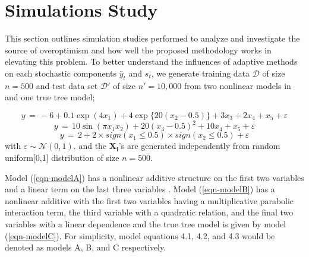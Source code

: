 
\chapter{Simulations Study}
This section outlines simulation studies performed to analyze and investigate the source of overoptimism and how well the proposed methodology works in elevating this problem. To better understand the influences of adaptive methods on each stochastic components $\bar{y}_t$ and $s_t$, we generate training data $\mathcal{D}$ of size $n=500$ and test data set $\mathcal{D}'$ of size $n'=10,000$ from two nonlinear models in \citep{friedman1991multivariate} and one  true tree model;

\begin{equation}
\label{eqn-modelA}
y \, = \,  -6 + 0.1 \exp(4x_1) + 4 \exp\{20(x_2 - 0.5)\} + 3 x_3 + 2 x_4 + x_5 + \varepsilon
\end{equation}
\begin{equation}
\label{eqn-modelB}
y \, = \,  10\sin(\pi x_1 x_2) + 20(x_3 - 0.5)^2 + 10 x_4 + x_5 + \varepsilon
\end{equation}
\begin{equation}
\label{eqn-modelC}
y \, = \,  2 + 2\times sign(x_1 \leq 0.5) \times sign(x_2 \leq 0.5) + \varepsilon
\end{equation}
with $\varepsilon \sim \mathcal{N}(0, 1).$ and the $\mathbf{X_i}$'s are generated independently from random uniform[0,1] distribution of size $n = 500$.

Model (\ref{eqn-modelA}) has a nonlinear additive structure on the first two variables and a linear term on the last three variables \citep{friedman1991multivariate}. Model (\ref{eqn-modelB}) has a nonlinear additive with the first two variables having a multiplicative parabolic interaction term, the third variable with a quadratic relation, and the final two variables with a linear dependence \citep{friedman1991multivariate} and the true tree model is given by model (\ref{eqn-modelC}). For simplicity, model equations 4.1, 4.2, and 4.3 would be denoted as models A, B, and C respectively.
       
